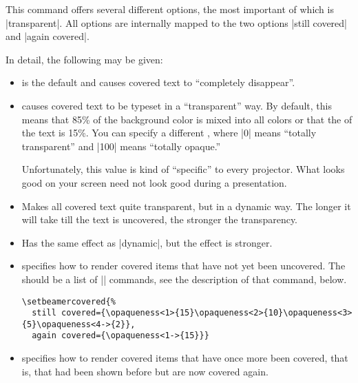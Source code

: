 \begin{command}{\setbeamercovered{}}
  This command offers several different options, the most important of which is |transparent|. All options are internally mapped to the two options |still covered| and |again covered|.

  In detail, the following  may be given:
  \begin{itemize}
  \item
     is the default and causes covered text to ``completely disappear''.
  \item
     causes covered text to be typeset in a ``transparent'' way. By default, this means that 85\% of the background color is mixed into all colors or that the  of the text is 15\%. You can specify a different , where |0| means ``totally transparent'' and |100| means ``totally opaque.''

    Unfortunately, this value is kind of ``specific'' to every projector. What looks good on your screen need not look good during a presentation.
  \item
     Makes all covered text quite transparent, but in a dynamic way. The longer it will take till the text is uncovered, the stronger the transparency.
  \item
     Has the same effect as |dynamic|, but the effect is stronger.
  \item
     specifies how to render covered items that have not yet been uncovered. The  should be a list of |\opaqueness| commands, see the description of that command, below.
    \example
\begin{verbatim}
\setbeamercovered{%
  still covered={\opaqueness<1>{15}\opaqueness<2>{10}\opaqueness<3>{5}\opaqueness<4->{2}},
  again covered={\opaqueness<1->{15}}}
\end{verbatim}

  \item
     specifies how to render covered items that have once more been covered, that is, that had been shown before but are now covered again.
  \end{itemize}
\end{command}


